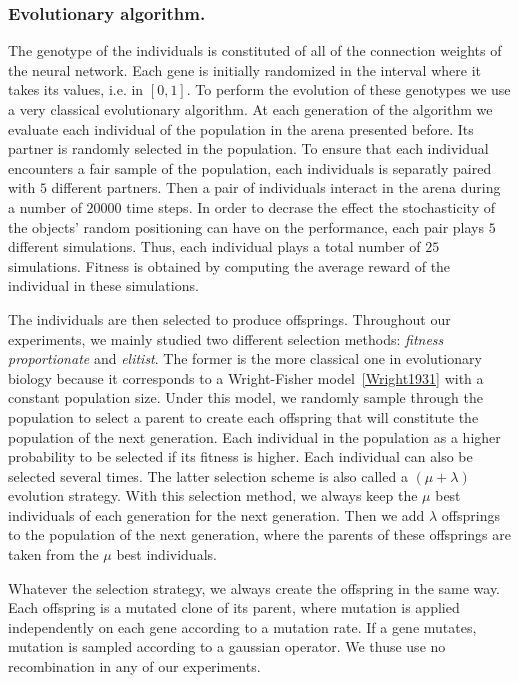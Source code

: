     \subsubsection{Evolutionary algorithm.} The genotype of the individuals is constituted of all of the connection weights of the neural network. Each gene is initially randomized in the interval where it takes its values, i.e. in \([0,1]\). To perform the evolution of these genotypes we use a very classical evolutionary algorithm. At each generation of the algorithm we evaluate each individual of the population in the arena presented before. Its partner is randomly selected in the population. To ensure that each individual encounters a fair sample of the population, each individuals is separatly paired with $5$ different partners. Then a pair of individuals interact in the arena during a number of $20000$ time steps. In order to decrase the effect the stochasticity of the objects' random positioning can have on the performance, each pair plays $5$ different simulations. Thus, each individual plays a total number of $25$ simulations. Fitness is obtained by computing the average reward of the individual in these simulations.

    The individuals are then selected to produce offsprings. Throughout our experiments, we mainly studied two different selection methods: \emph{fitness proportionate} and \emph{elitist}. The former is the more classical one in evolutionary biology because it corresponds to a Wright-Fisher model~\ref{Wright1931} with a constant population size. Under this model, we randomly sample through the population to select a parent to create each offspring that will constitute the population of the next generation. Each individual in the population as a higher probability to be selected if its fitness is higher. Each individual can also be selected several times. The latter selection scheme is also called a \((\mu + \lambda)\) evolution strategy. With this selection method, we always keep the $\mu$ best individuals of each generation for the next generation. Then we add $\lambda$ offsprings to the population of the next generation, where the parents of these offsprings are taken from the $\mu$ best individuals. 


    Whatever the selection strategy, we always create the offspring in the same way. Each offspring is a mutated clone of its parent, where mutation is applied independently on each gene according to a mutation rate. If a gene mutates, mutation is sampled according to a gaussian operator. We thuse use no recombination in any of our experiments.


